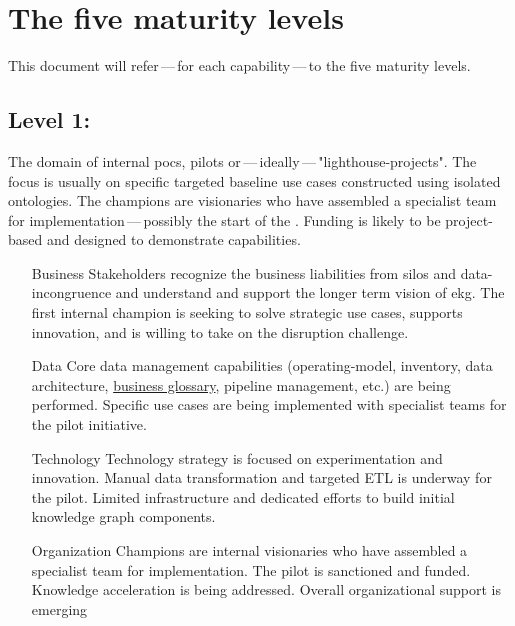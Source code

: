 \section{The five maturity levels}\label{sec:the-five-maturity-levels}

This document will refer\,---\,for each capability\,---\,to the five maturity levels.

\subsection{Level 1: \ekgmmLevelOneLabel}

The domain of internal \glspl{poc}, pilots or\,---\,ideally\,---\,"\glspl{lighthouse-project}".
The focus is usually on specific targeted baseline use cases constructed using isolated ontologies.
The champions are visionaries who have assembled a specialist team for implementation\,---\,possibly the
start of the .
Funding is likely to be project-based and designed to demonstrate capabilities.

\begin{itemize}[leftmargin=1in,font=\bfseries]

    \item[Business]     Stakeholders recognize the business liabilities from silos and \gls{data-incongruence} and
                        understand and support the longer term vision of \gls{ekg}.
                        The first internal champion is seeking to solve strategic use cases, supports innovation,
                        and is willing to take on the disruption challenge.
    \item[Data]         Core data management capabilities (\gls{operating-model}, inventory, data architecture,
                        \hyperref[sec:ekg-mm-business-glossary]{business glossary}, pipeline management, etc.)
                        are being performed.
                        Specific use cases are being implemented with specialist teams for the pilot initiative.
    \item[Technology]   Technology strategy is focused on experimentation and innovation.
                        Manual data transformation and targeted ETL is underway for the pilot.
                        Limited infrastructure and dedicated efforts to build initial knowledge graph components.
    \item[Organization] Champions are internal visionaries who have assembled a specialist team for implementation.
                        The pilot is sanctioned and funded.
                        Knowledge acceleration is being addressed.
                        Overall organizational support is emerging
\end{itemize}

